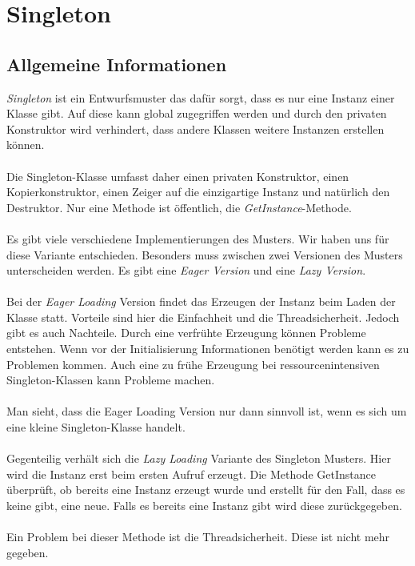 \chapter{Singleton}

\section{Allgemeine Informationen}

\textit{Singleton} ist ein Entwurfsmuster das dafür sorgt, dass es nur eine Instanz einer Klasse gibt. Auf diese kann global zugegriffen werden und durch den privaten Konstruktor wird verhindert, dass andere Klassen weitere Instanzen erstellen können.
\\
\\
Die Singleton-Klasse umfasst daher einen privaten Konstruktor, einen Kopierkonstruktor, einen Zeiger auf die einzigartige Instanz und natürlich den Destruktor. Nur eine Methode ist öffentlich, die \textit{GetInstance}-Methode.
\\
\\
Es gibt viele verschiedene Implementierungen des Musters. Wir haben uns für diese Variante entschieden. Besonders muss zwischen zwei Versionen des Musters unterscheiden werden. Es gibt eine \textit{Eager Version} und eine \textit{Lazy Version}.
\\
\\
Bei der \textit{Eager Loading} Version findet das Erzeugen der Instanz beim Laden der Klasse statt. Vorteile sind hier die Einfachheit und die Threadsicherheit. Jedoch gibt es auch Nachteile. Durch eine verfrühte Erzeugung können Probleme entstehen. Wenn vor der Initialisierung Informationen benötigt werden kann es zu Problemen kommen. Auch eine zu frühe Erzeugung bei ressourcenintensiven Singleton-Klassen kann Probleme machen.
\\
\\
Man sieht, dass die Eager Loading Version nur dann sinnvoll ist, wenn es sich um eine kleine Singleton-Klasse handelt.
\\
\\
Gegenteilig verhält sich die \textit{Lazy Loading} Variante des Singleton Musters. Hier wird die Instanz erst beim ersten Aufruf erzeugt. Die Methode GetInstance überprüft, ob bereits eine Instanz erzeugt wurde und erstellt für den Fall, dass es keine gibt, eine neue. Falls es bereits eine Instanz gibt wird diese zurückgegeben.
\\
\\
Ein Problem bei dieser Methode ist die Threadsicherheit. Diese ist nicht mehr gegeben. \\

